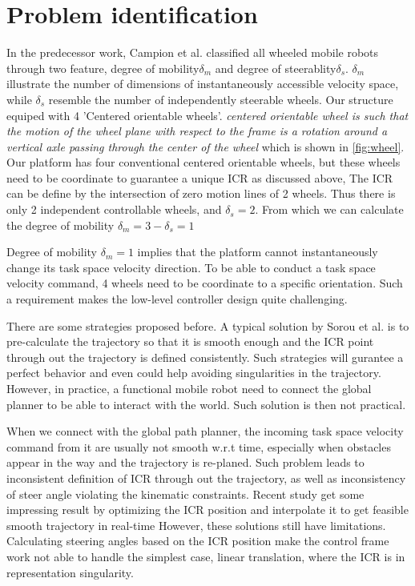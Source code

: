 \section{Problem identification}
\label{sec:problemIdentification}
In the predecessor work, Campion et al. classified all wheeled mobile robots through two feature, degree of mobility$\delta_m$ and degree of steerablity$\delta_s$. $\delta_m$ illustrate the number of dimensions of instantaneously accessible velocity space, while $\delta_s$ resemble the number of independently steerable wheels. Our structure equiped with 4 'Centered orientable wheels'. \textit{centered orientable wheel is such that the motion of the wheel plane with respect to the frame is a rotation around a vertical axle passing through the center of the wheel}\cite{campion1996structural} which is shown in \cref{fig:wheel}. Our platform has four conventional centered orientable wheels, but these wheels need to be coordinate to guarantee a unique ICR as discussed above, The ICR can be define by the intersection of zero motion lines of 2 wheels. Thus there is only 2 independent controllable wheels, and $\delta_s = 2$. From which we can calculate the degree of mobility $\delta_m = 3 - \delta_s = 1$ 

Degree of mobility $\delta_m = 1$ implies that the platform cannot instantaneously change its task space velocity direction. To be able to conduct a task space velocity command, 4 wheels need to be coordinate to a specific
orientation. Such a requirement makes the low-level controller design quite challenging.

There are some strategies proposed before. A typical solution by Sorou et al. \cite{sorour2016kinematic} is to pre-calculate the trajectory so that it is smooth enough and the ICR point through out the trajectory is defined consistently. Such strategies will gurantee a perfect behavior and even could help avoiding singularities in the trajectory. However, in practice, a functional mobile robot need to connect the global planner to be able to interact with the world. Such solution is then not practical. 

When we connect with the global path planner, the incoming task space velocity command from it are usually not smooth w.r.t time, especially when obstacles appear in the way and the trajectory is re-planed. Such problem leads to inconsistent definition of ICR through out the trajectory, as well as inconsistency of steer angle violating the kinematic constraints. Recent study get some  impressing  result by optimizing the ICR position and interpolate it to get feasible smooth trajectory in real-time \cite{sorour2016motion}
However, these solutions still have limitations. Calculating steering angles based on the ICR position make the control frame work not able to handle the simplest case, linear translation, where the ICR is in representation singularity.

